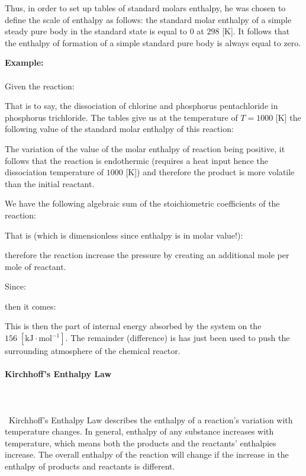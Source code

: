 	Thus, in order to set up tables of standard molars enthalpy, he was chosen to define the scale of enthalpy as follows: the standard molar enthalpy of a simple steady pure body in the standard state is equal to $0$ at $298$ [K]. It follows that the enthalpy of formation of a simple standard pure body is always equal to zero.
	\begin{tcolorbox}[colframe=black,colback=white,sharp corners]
	\textbf{{\Large {}}Example:}\\\\
	Given the reaction:
	
	That is to say, the dissociation of chlorine and phosphorus pentachloride in phosphorus trichloride. The tables give us at the temperature of $T=1000$ [K] the following value of the standard molar enthalpy of this reaction:
	
	The variation of the value of the molar enthalpy of reaction being positive, it follows that the reaction is endothermic (requires a heat input hence the dissociation temperature of $1000$ [K]) and therefore the product is more volatile than the initial reactant.

	We have the following algebraic sum of the stoichiometric coefficients of the reaction:
	
	That is (which is dimensionless since enthalpy is in molar value!):
	
	therefore the reaction increase the pressure by creating an additional mole per mole of reactant.

	Since:
	
	then it comes:
	
	This is then the part of internal energy absorbed by the system on the $156 \;[\text{kJ}\cdot \text{mol}^{-1}]$. The remainder (difference) is has just been used to push the surrounding atmosphere of the chemical reactor.
	\end{tcolorbox}
	
	\paragraph{Kirchhoff's Enthalpy Law}\mbox{}\\\\\
	Kirchhoff's Enthalpy Law describes the enthalpy of a reaction's variation with temperature changes. In general, enthalpy of any substance increases with temperature, which means both the products and the reactants' enthalpies increase. The overall enthalpy of the reaction will change if the increase in the enthalpy of products and reactants is different.
	
